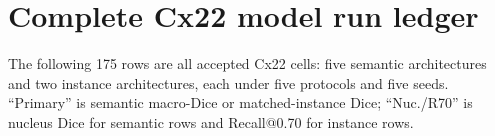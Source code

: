 \chapter{Complete Cx22 model run ledger}\label{s1:ch:app03_complete_cx22_model_run_ledger}

The following 175 rows are all accepted Cx22 cells: five semantic architectures and two instance architectures, each under five protocols and five seeds. ``Primary'' is semantic macro-Dice or matched-instance Dice; ``Nuc./R70'' is nucleus Dice for semantic rows and Recall@0.70 for instance rows.

\begin{landscape}
\scriptsize
\setlength{\tabcolsep}{2.2pt}

\end{landscape}
